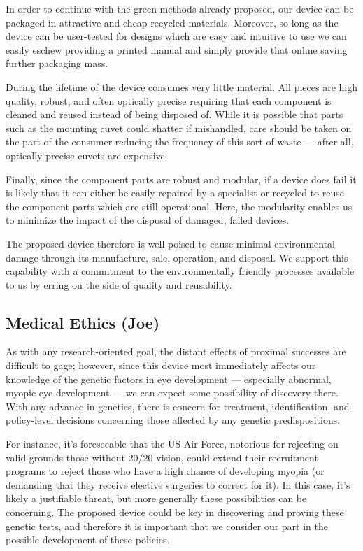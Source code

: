 \documentclass{article}
\begin{document}
In order to continue with the green methods already proposed, our
device can be packaged in attractive and cheap recycled
materials. Moreover, so long as the device can be user-tested for
designs which are easy and intuitive to use we can easily eschew
providing a printed manual and simply provide that online saving
further packaging mass.

During the lifetime of the device consumes very little material. All
pieces are high quality, robust, and often optically precise requiring
that each component is cleaned and reused instead of being disposed
of. While it is possible that parts such as the mounting cuvet could
shatter if mishandled, care should be taken on the part of the
consumer reducing the frequency of this sort of waste --- after all,
optically-precise cuvets are expensive.

Finally, since the component parts are robust and modular, if a device
does fail it is likely that it can either be easily repaired by a
specialist or recycled to reuse the component parts which are still
operational. Here, the modularity enables us to minimize the impact of
the disposal of damaged, failed devices.

The proposed device therefore is well poised to cause minimal
environmental damage through its manufacture, sale, operation, and
disposal. We support this capability with a commitment to the
environmentally friendly processes available to us by erring on the
side of quality and reusability.


\subsection{Medical Ethics (Joe)}
\label{sec:blah-blah-blah}

As with any research-oriented goal, the distant effects of proximal
successes are difficult to gage; however, since this device most
immediately affects our knowledge of the genetic factors in eye
development --- especially abnormal, myopic eye development --- we can
expect some possibility of discovery there. With any advance in
genetics, there is concern for treatment, identification, and
policy-level decisions concerning those affected by any genetic
predispositions.

For instance, it's foreseeable that the US Air Force, notorious for
rejecting on valid grounds those without 20/20 vision, could extend
their recruitment programs to reject those who have a high chance of
developing myopia (or demanding that they receive elective surgeries
to correct for it). In this case, it's likely a justifiable threat,
but more generally these possibilities can be concerning. The proposed
device could be key in discovering and proving these genetic tests,
and therefore it is important that we consider our part in the
possible development of these policies.
\end{document}
